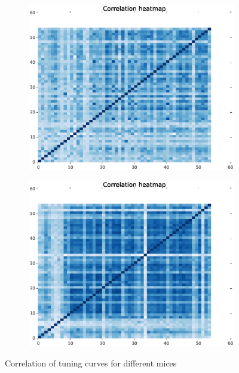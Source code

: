 \documentclass[11pt]{article}
\begin{document}
\begin{figure}
\begin{subfigure}{.48\textwidth}
        \centering
        \includegraphics[width=\linewidth]{plots/tuningCorr_desc_civar_m3}
    \end{subfigure}
    \begin{subfigure}{.48\textwidth}
        \centering
        \includegraphics[width=\linewidth]{plots/tuningCorr_desc_civar_m4}
    \end{subfigure}
    \caption{Correlation of tuning curves for different mices}
    \label{tuningCorr}
\end{figure}
\end{document}
